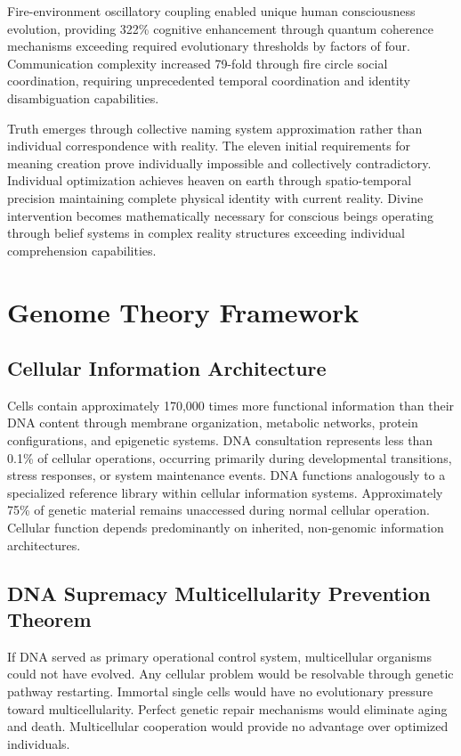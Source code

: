 \documentclass[12pt,a4paper]{article}
\begin{document}
Fire-environment oscillatory coupling enabled unique human consciousness evolution, providing 322\% cognitive enhancement through quantum coherence mechanisms exceeding required evolutionary thresholds by factors of four. Communication complexity increased 79-fold through fire circle social coordination, requiring unprecedented temporal coordination and identity disambiguation capabilities.

Truth emerges through collective naming system approximation rather than individual correspondence with reality. The eleven initial requirements for meaning creation prove individually impossible and collectively contradictory. Individual optimization achieves heaven on earth through spatio-temporal precision maintaining complete physical identity with current reality. Divine intervention becomes mathematically necessary for conscious beings operating through belief systems in complex reality structures exceeding individual comprehension capabilities.

\section{Genome Theory Framework}

\subsection{Cellular Information Architecture}

Cells contain approximately 170,000 times more functional information than their DNA content through membrane organization, metabolic networks, protein configurations, and epigenetic systems. DNA consultation represents less than 0.1\% of cellular operations, occurring primarily during developmental transitions, stress responses, or system maintenance events. DNA functions analogously to a specialized reference library within cellular information systems. Approximately 75\% of genetic material remains unaccessed during normal cellular operation. Cellular function depends predominantly on inherited, non-genomic information architectures.

\subsection{DNA Supremacy Multicellularity Prevention Theorem}

If DNA served as primary operational control system, multicellular organisms could not have evolved. Any cellular problem would be resolvable through genetic pathway restarting. Immortal single cells would have no evolutionary pressure toward multicellularity. Perfect genetic repair mechanisms would eliminate aging and death. Multicellular cooperation would provide no advantage over optimized individuals.
\end{document}
